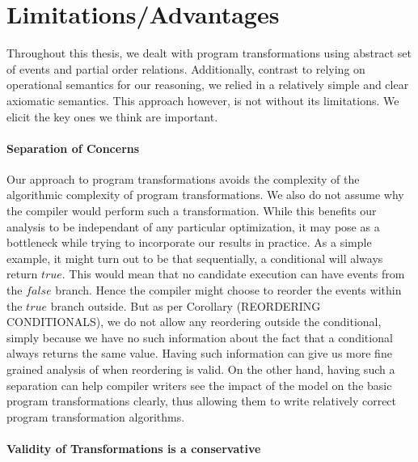 \section{Limitations/Advantages}

    Throughout this thesis, we dealt with program transformations using abstract set of events and partial order relations. 
    Additionally, contrast to relying on operational semantics for our reasoning, we relied in a relatively simple and clear axiomatic semantics. 
    This approach however, is not without its limitations. 
    We elicit the key ones we think are important. 

    \paragraph{Separation of Concerns}

    Our approach to program transformations avoids the complexity of the algorithmic complexity of program transformations. 
    We also do not assume why the compiler would perform such a transformation.
    While this benefits our analysis to be independant of any particular optimization, it may pose as a bottleneck while trying to incorporate our results in practice. 
    As a simple example, it might turn out to be that sequentially, a conditional will always return $true$. This would mean that no candidate execution can have events from the $false$ branch. Hence the compiler might choose to reorder the events within the $true$ branch outside. 
    But as per Corollary (REORDERING CONDITIONALS), we do not allow any reordering outside the conditional, simply because we have no such information about the fact that a conditional always returns the same value. 
    Having such information can give us more fine grained analysis of when reordering is valid. 
    On the other hand, having such a separation can help compiler writers see the impact of the model on the basic program transformations clearly, thus allowing them to write relatively correct program transformation algorithms. 

    \paragraph{Validity of Transformations is a conservative}


